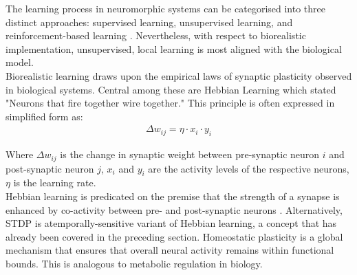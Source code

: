 




\noindent The learning process in neuromorphic systems can be categorised into three distinct approaches: supervised learning, unsupervised learning, and reinforcement-based learning \cite{stone2019artificial}. Nevertheless, with respect to biorealistic implementation, unsupervised, local learning is most aligned with the biological model. \\

\noindent Biorealistic learning draws upon the empirical laws of synaptic plasticity observed in biological systems. Central among these are Hebbian Learning \cite{kempter1999hebbian} which stated "Neurons that fire together wire together." This principle is often expressed in simplified form as:\\
\begin{align}
    \Delta w_{ij} = \eta \cdot x_i \cdot y_i \label{eq:1.31}
\end{align}

\noindent Where $\Delta w_{ij}$ is the change in synaptic weight between pre-synaptic neuron $i$ and post-synaptic neuron $j$, $x_i$ and $y_i$ are the activity levels of the respective neurons, $\eta$ is the learning rate. \\

\noindent Hebbian learning is predicated on the premise that the strength of a synapse is enhanced by co-activity between pre- and post-synaptic neurons \cite{frenkel2019morphic}. Alternatively, STDP is atemporally-sensitive variant of Hebbian learning, a concept that has already been covered in the preceding section. Homeostatic plasticity is a global mechanism that ensures that overall neural activity remains within functional bounds. This is analogous to metabolic regulation in biology.\\

